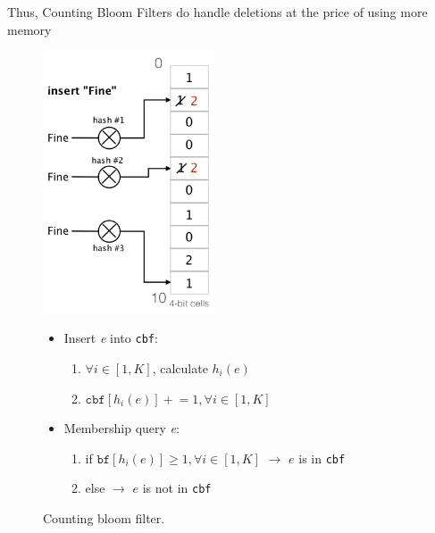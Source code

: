 \documentclass[11pt,oneside,a4paper]{article}
\begin{document}
Thus, Counting Bloom Filters do handle deletions at the price of using more memory
\vspace{0pt}
\begin{figure}[b!]
	\begin{minipage}[t]{.5\textwidth} 
		\vspace{0pt}
		\centering 
		\includegraphics[width=0.45\textwidth]{figures/counting_bloom_filter}
		\caption{Counting bloom filter. \cite{advnet}}
		\label{fig:counting_bloom_filter}
	\end{minipage} 
	\begin{minipage}[t]{.5\textwidth} 
		\vspace{10pt} 
		\begin{itemize}
			\setlength{\itemsep}{0pt}
			\setlength{\parskip}{0pt}
			\item Insert \textit{e} into \texttt{cbf}: 
			\begin{enumerate}
				\item $\forall i \in [1,K]$, calculate $h_i(e)$
				\item $\texttt{cbf}[h_i(e)] \mathrel{+}= 1, \forall i \in [1,K]$
			\end{enumerate}
			\item Membership query \textit{e}:
			\begin{enumerate}
				\item if $\texttt{bf}[h_i(e)] \geq 1, \forall i \in [1,K]$ 
				\newline $\rightarrow$ $e$ is in \texttt{cbf}
				\item else 
				\newline $\rightarrow$ $e$ is not in \texttt{cbf}
			\end{enumerate}
		\end{itemize}
	\end{minipage} 
\end{figure}
\end{document}
